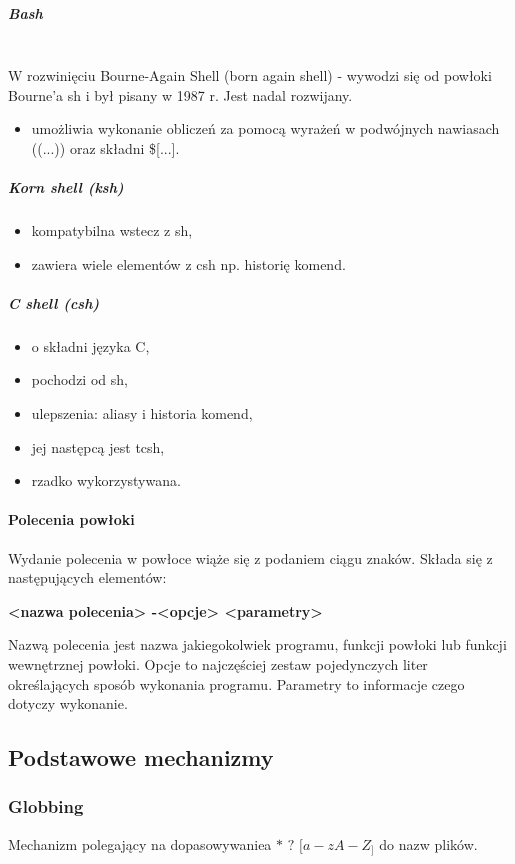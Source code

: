 \documentclass[a4paper,twoside]{report}
\begin{document}
\subparagraph{Bash\\\\}
W rozwinięciu Bourne-Again Shell (born again shell) - wywodzi się od powłoki Bourne'a sh i był pisany w 1987 r. Jest nadal rozwijany.
\begin{itemize}
	\item umożliwia wykonanie obliczeń za pomocą wyrażeń w podwójnych nawiasach ((...)) oraz składni \$[...].
\end{itemize}

\subparagraph{Korn shell (ksh)}
\begin{itemize}
	\item kompatybilna wstecz z sh,
	\item zawiera wiele elementów z csh np. historię komend.
\end{itemize}


\subparagraph{C shell (csh)}
\begin{itemize}
	\item o składni języka C,
	\item pochodzi od sh,
	\item ulepszenia: aliasy i historia komend,
	\item jej następcą jest tcsh,
	\item rzadko wykorzystywana.
\end{itemize}

\paragraph{Polecenia powłoki\\}

Wydanie polecenia w powłoce wiąże się z podaniem ciągu znaków. Składa się z następujących elementów:
\begin{center}\textbf{<nazwa polecenia> -<opcje> <parametry>}\end{center}

Nazwą polecenia jest nazwa jakiegokolwiek programu, funkcji powłoki lub funkcji   wewnętrznej powłoki. Opcje to najczęściej zestaw pojedynczych liter określających     sposób wykonania programu. Parametry to informacje czego dotyczy wykonanie.

\subsection{Podstawowe mechanizmy}
\subsubsection{Globbing\\}
Mechanizm polegający na dopasowywaniea
$*$ $?$ $[a-z A-Z_]$ do nazw plików.
\end{document}
